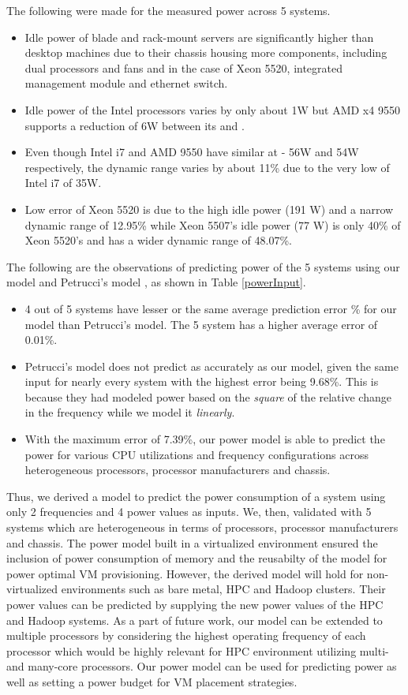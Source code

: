 \documentclass{sig-alternate}
\begin{document}
The following were made for the measured power across 5 systems. 
\begin{itemize}
\item Idle power of blade and rack-mount servers are significantly higher than desktop machines due to their chassis housing more components, including dual processors and fans and in the case of Xeon 5520, integrated management module and ethernet switch. 
 \item Idle power of the Intel processors varies by only about 1W but AMD x4 9550 supports a reduction of 6W between its  and .
\item Even though Intel i7 and AMD 9550 have similar  at  - 56W and 54W respectively, the dynamic range varies by about 11\% due to the very low  of Intel i7 of 35W. 
 \item Low error of Xeon 5520 is due to the high idle power (191 W) and a narrow dynamic range of 12.95\% while Xeon 5507's idle power (77 W) is only 40\% of Xeon 5520's and has a wider dynamic range of 48.07\%.
 \end{itemize}
The following are the observations of predicting power of the 5 systems using our model and Petrucci's model \cite{Petrucci2011}, as shown in Table \ref{powerInput}. \begin{itemize}
 \item 4 out of 5 systems have lesser or the same average prediction error \% for our model than Petrucci's model. The 5 system has a higher average error of 0.01\%. 
 \item Petrucci's model does not predict as accurately as our model, given the same input for nearly every system with the highest error being 9.68\%.  This is because they had modeled power based on the \emph{square} of the relative change in the frequency while we model it \emph{linearly}.
 \item With the maximum error of 7.39\%, our power model is able to predict the power for various CPU utilizations and frequency configurations across heterogeneous processors, processor manufacturers and chassis. 
\end{itemize}
Thus, we derived a model to predict the power consumption of a system using only 2 frequencies and 4 power values as inputs. We, then, validated with 5 systems which are heterogeneous in terms of processors, processor manufacturers and chassis. The power model built in a virtualized environment ensured the inclusion of power consumption of memory and the reusabilty of the model for power optimal VM provisioning. However, the derived model will hold for non-virtualized environments such as bare metal, HPC and Hadoop clusters. Their power values can be predicted by supplying the new power values of the HPC and Hadoop systems. As a part of future work, our model can be extended to multiple processors by considering the highest operating frequency of each processor which would be highly relevant for HPC environment utilizing multi- and many-core processors. Our power model can be used for predicting power as well as setting a power budget for VM placement strategies. 
\end{document}
